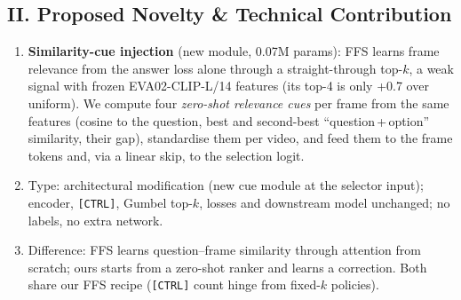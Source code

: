 \documentclass[8pt,a4paper]{article}
\begin{document}
\subsection*{II. Proposed Novelty \& Technical Contribution}
\begin{enumerate}
    \item \textbf{Similarity-cue injection} (new module, 0.07M params): FFS learns frame relevance from the answer loss alone through a straight-through top-$k$, a weak signal with frozen EVA02-CLIP-L/14 features (its top-4 is only +0.7 over uniform). We compute four \emph{zero-shot relevance cues} per frame from the same features (cosine to the question, best and second-best ``question\,+\,option'' similarity, their gap), standardise them per video, and feed them to the frame tokens and, via a linear skip, to the selection logit.
    \item Type: architectural modification (new cue module at the selector input); encoder, \texttt{[CTRL]}, Gumbel top-$k$, losses and downstream model unchanged; no labels, no extra network.
    \item Difference: FFS learns question--frame similarity through attention from scratch; ours starts from a zero-shot ranker and learns a correction. Both share our FFS recipe (\texttt{[CTRL]} count hinge from fixed-$k$ policies).
\end{enumerate}

\end{document}
